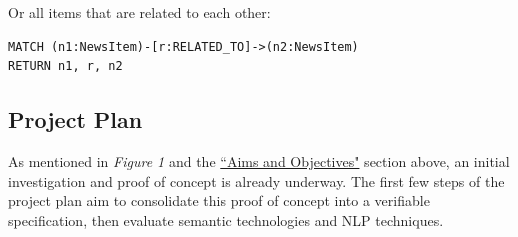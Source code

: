 \documentclass[11pt]{article}
\begin{document}
Or all items that are related to each other:

\begin{verbatim}
MATCH (n1:NewsItem)-[r:RELATED_TO]->(n2:NewsItem)
RETURN n1, r, n2
\end{verbatim}




\subsection{Project Plan}
\label{sec:ProjectPlan}
As mentioned in \textit{Figure 1} and the \hyperref[sec:AimsObjectives]{``Aims and Objectives"} section above, an initial investigation and proof of concept is already underway. The first few steps of the project plan aim to consolidate this proof of concept into a verifiable specification, then evaluate semantic technologies and NLP techniques.
\end{document}
